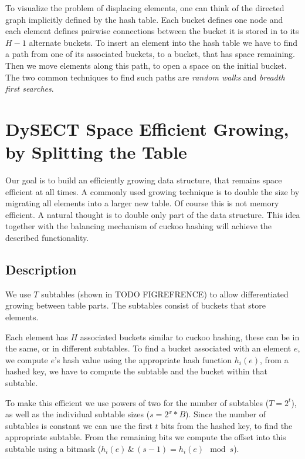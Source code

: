 \documentclass[a4paper,UKenglish]{lipics-v2016}
\begin{document}
\label{sec:cuckoo_graph}
To visualize the problem of displacing elements, one can think of the
directed graph implicitly defined by the hash table.  Each bucket
defines one node and each element defines pairwise connections between
the bucket it is stored in to its $H-1$ alternate buckets.  To insert
an element into the hash table we have to find a path from one of its
associated buckets, to a bucket, that has space remaining.  Then we
move elements along this path, to open a space on the initial bucket.
The two common techniques to find such paths are \emph{random walks} and
\emph{breadth first searches}.

\section{DySECT Space Efficient Growing, by Splitting the Table}
Our goal is to build an efficiently growing data structure, that
remains space efficient at all times.  A commonly used growing
technique is to double the size by migrating all elements
into a larger new table.  Of course this is
not memory efficient.  A natural thought is to double
only part of the data structure.  This idea together with the
balancing mechanism of cuckoo hashing will achieve the
described functionality.

\subsection{Description}
We use $T$ subtables (shown in TODO FIGREFRENCE) to allow
differentiated growing between table parts.  The subtables consist of
buckets that store elements.

Each element has $H$ associated
buckets similar to cuckoo hashing, these can be in the same, or
in different subtables.  To find a bucket associated with an element $e$,
we compute $e$'s hash value using the appropriate hash function
$h_i(e)$, from a hashed key, we have to compute the subtable and the bucket
within that subtable.

To make this efficient we use powers of two for the number of
subtables ($T = 2^t$), as well as the individual subtable sizes ($s =
2^x*B$).  Since the number of subtables is constant we can use the
first $t$ bits from the hashed key, to find the appropriate subtable.
From the remaining bits we compute the offset into this subtable using
a bitmask ($h_i(e)\,\texttt{\&}\,(s-1) = h_i(e) \mod s$).

\end{document}
